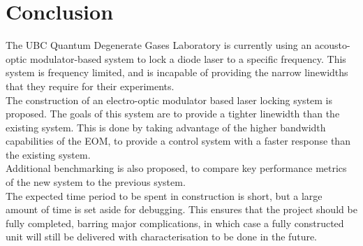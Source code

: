 \newpage
\section{Conclusion}

The UBC Quantum Degenerate Gases Laboratory is currently using an acousto-optic modulator-based system to lock a diode laser to a specific frequency.  This system is frequency limited, and is incapable of providing the narrow linewidths that they require for their experiments. \\

The construction of an electro-optic modulator based laser locking system is proposed.  The goals of this system are to provide a tighter linewidth than the existing system.  This is done by taking advantage of the higher bandwidth capabilities of the EOM, to provide a control system with a faster response than the existing system. \\

Additional benchmarking is also proposed, to compare key performance metrics of the new system to the previous system. \\

The expected time period to be spent in construction is short, but a large amount of time is set aside for debugging.  This ensures that the project should be fully completed, barring major complications, in which case a fully constructed unit will still be delivered with characterisation to be done in the future.
